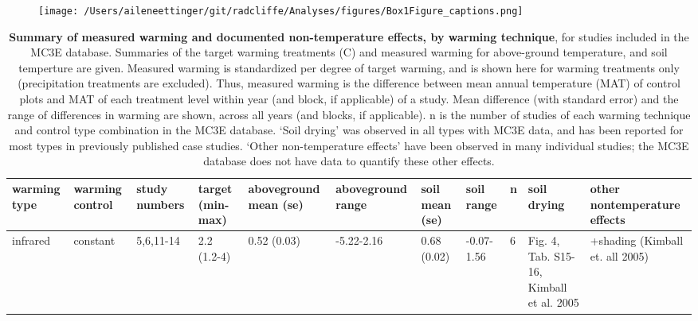 \documentclass{article}
\begin{document}
\begin{figure}[!htb]
\centering

 \texttt{[image: /Users/aileneettinger/git/radcliffe/Analyses/figures/Box1Figure\_captions.png]} 
 \caption{} 
 
\label{fig:exps}
\end{figure}
 


\begin{landscape}

\begin{table}[ht]
\centering
\caption{\textbf{Summary of measured warming and documented non-temperature effects, by warming technique}, for studies included in the MC3E database. Summaries of the target warming treatments (\degree C) and measured warming for above-ground temperature, and soil temperture are given. Measured warming is standardized per degree of target warming, and is shown here for warming treatments only (precipitation treatments are excluded). Thus, measured warming is the difference between mean annual temperature (MAT) of control plots and MAT of each treatment level within year (and block, if applicable) of a study. Mean difference (with standard error) and the range of differences in warming are shown, across all years (and blocks, if applicable). n is the number of studies of each warming technique and control type combination in the MC3E database. `Soil drying' was observed in all types with MC3E data, and has been reported for most types in previously published case studies. `Other non-temperature effects' have been observed in many individual studies; the MC3E database does not have data to quantify these other effects.} 
\label{tab:warmtech}
\begingroup\footnotesize
\begin{tabular}{|p{}|p{}|p{}|p{}|p{}|p{}|p{}|p{}|p{}|p{}|p{}|}
  \hline
warming type & warming control & study numbers & target (min-max) & aboveground mean (se) & aboveground range & soil mean (se) & soil range & n & soil drying & other nontemperature effects \\ 
  \hline
infrared & constant & 5,6,11-14 & 2.2 (1.2-4) & 0.52 (0.03) & -5.22-2.16 & 0.68 (0.02) & -0.07-1.56 & 6 & Fig. 4, Tab. S15-16, Kimball et al. 2005 & +shading (Kimball et. all 2005) \\ 

\end{tabular}
\end{table}
\end{landscape}
\end{document}
